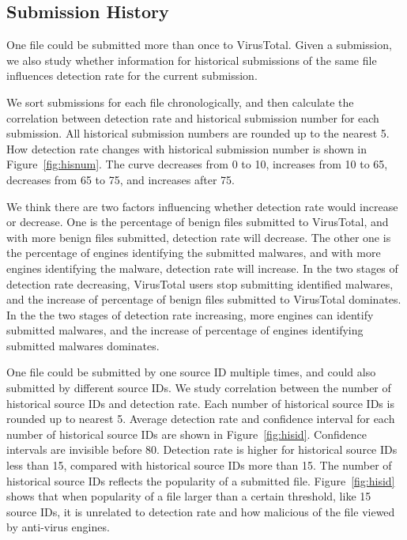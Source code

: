 \subsection{Submission History}
\label{sec:history}



One file could be submitted more than once to VirusTotal. 
Given a submission, we also study whether information for historical 
submissions of the same file influences detection rate for the current submission. 

We sort submissions for each file chronologically, 
and then calculate the correlation between detection rate and historical submission number for each submission. 
All historical submission numbers are rounded up to the nearest 5. 
How detection rate changes with historical submission number is shown in Figure~\ref{fig:hisnum}. 
The curve decreases from 0 to 10, increases from 10 to 65, decreases from 65 to 75, and increases after 75. 

We think there are two factors influencing whether detection rate would increase or decrease.
One is the percentage of benign files submitted to VirusTotal, 
and with more benign files submitted, detection rate will decrease.   
The other one is the percentage of engines identifying the submitted malwares, 
and with more engines identifying the malware, detection rate will increase. 
In the two stages of detection rate decreasing, 
VirusTotal users stop submitting identified malwares, 
and the increase of percentage of benign files submitted to VirusTotal dominates. 
In the the two stages of detection rate increasing, 
more engines can identify submitted malwares, 
and the increase of percentage of engines identifying submitted malwares dominates. 

One file could be submitted by one source ID multiple times, 
and could also submitted by different source IDs. 
We study correlation between the number of historical source IDs and detection rate. 
Each number of historical source IDs is rounded up to nearest 5. 
Average detection rate and confidence interval for each number of historical source IDs are shown in Figure~\ref{fig:hisid}. 
Confidence intervals are invisible before 80. 
Detection rate is higher for historical source IDs less than 15, compared with historical source IDs more than 15.
The number of historical source IDs reflects the popularity of a submitted file.
Figure~\ref{fig:hisid} shows that when popularity of a file larger than a certain threshold, like 15 source IDs, 
it is unrelated to detection rate and how malicious of the file viewed by anti-virus engines. 


